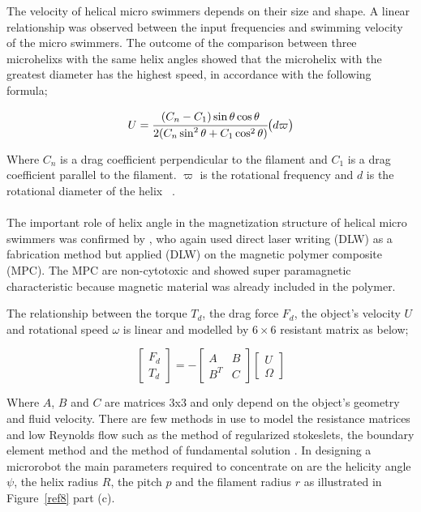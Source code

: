 \documentclass[a4paper,11pt]{article}
\begin{document}
\begin{sloppypar}
The velocity of helical micro swimmers depends on their size and shape. A linear relationship was 
observed between the input frequencies and swimming velocity of the micro swimmers. The outcome of 
the comparison between three microhelixs with the same helix angles showed that the microhelix with the
 greatest diameter has the highest speed, in accordance with the following formula;

\begin{equation}
  U = {\cfrac{(C_n - C_1) \sin \theta \cos \theta}{2(C_n \sin^2 \theta + C_1 \cos^2 \theta)}} \big( d \varpi \big)
\end{equation} 

Where $C_n$ is a drag coefficient perpendicular to the filament and $C_1$ is a drag coefficient
 parallel to the filament. $ \varpi$ is the rotational frequency and $d$ is the rotational diameter of 
the helix ~\citep{tottori2012magnetic}.  



\paragraph{}
The important role of helix angle in the magnetization structure of helical micro swimmers 
was confirmed by \citeauthor{peyer2013bacteria}, who again used direct laser writing (DLW) as a fabrication method but 
applied (DLW) on the magnetic polymer composite (MPC). The MPC are non-cytotoxic and showed 
super paramagnetic characteristic because magnetic material was already included in the polymer. 

The relationship between the torque $T_d$, the drag force $F_d$, the object\rq{}s velocity $U$ and rotational 
speed $\omega$ is linear and modelled by $6\times6$ resistant matrix as below;



\[
\begin{bmatrix} F_d \\ 
T_d \end{bmatrix}  =- \begin{bmatrix} A & B \\ 
B^T & C \end{bmatrix}  \begin{bmatrix} U
 \\ \Omega
\end{bmatrix}
\]




Where $A$, $B$ and $C$ are matrices 3x3 and only depend on the object\rq{}s geometry and fluid velocity. 
There are few methods in use to model the resistance matrices and low Reynolds flow such as the 
method of regularized stokeslets, the boundary element method and the method of fundamental solution
. In designing a microrobot the main parameters required to concentrate on are the helicity angle $\psi$, 
the helix radius $R$, the pitch $p$ and the filament radius $r$ as illustrated in Figure~\ref{ref8} part (c). 


\end{sloppypar}
\end{document}
